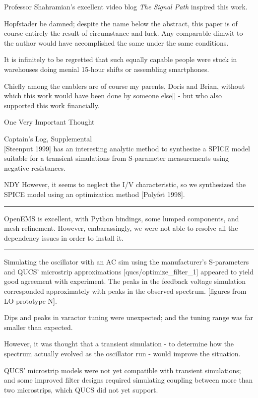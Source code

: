 \documentclass[fleqn,10pt]{article}
\begin{document}
\begin{multicols}{1}
Professor Shahramian's excellent video blog {\it The Signal Path} inspired this work.

Hopfstader be damned; despite the name below the abstract, this paper is of course entirely the result of circumstance and luck. Any comparable dimwit to the author would have accomplished the same under the same conditions. 

It is infinitely to be regretted that such equally capable people were stuck in warehouses doing menial 15-hour shifts or assembling smartphones.

Chiefly among the enablers are of course my parents, Doris and Brian, without which this work would have been done by someone else[] - but who also supported this work financially. 



One Very Important Thought


\clearpage

{\Large Captain's Log, Supplemental}\\

[Steenput 1999] has an interesting analytic method to synthesize a SPICE model suitable for a transient simulations from S-parameter measurements using negative resistances. 

NDY However, it seems to neglect the I/V characteristic, so we synthesized the SPICE model using an optimization method [Polyfet 1998].

\rule{\linewidth}{0.2pt}

OpenEMS is excellent, with Python bindings, some lumped components, and mesh refinement. However, embarassingly, we were not able to resolve all the dependency issues in order to install it.

\rule{\linewidth}{0.2pt}

Simulating the oscillator with an AC sim using the manufacturer's S-parameters and QUCS' microstrip approximations [qucs/optimize\_filter\_1] appeared to yield good agreement with experiment. The peaks in the feedback voltage simulation corresponded approximately with peaks in the observed spectrum. [figures from LO prototype N]. 
 
Dips and peaks in varactor tuning were unexpected; and the tuning range was far smaller than expected.

However, it was thought that a transient simulation - to determine how the spectrum actually evolved as the oscillator run - would improve the situation. 

QUCS' microstrip models were not yet compatible with transient simulations; and some improved filter designs required simulating coupling between more than two microstrips, which QUCS did not yet support.


\end{multicols}
\end{document}

